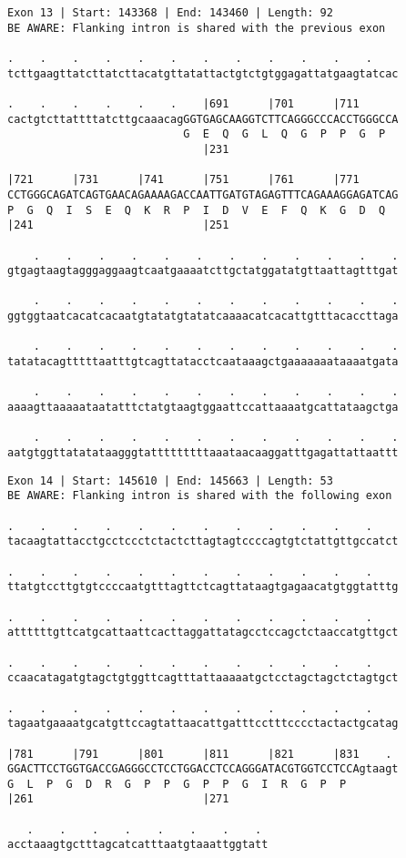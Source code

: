 \documentclass{article}
\begin{document}
\begin{Verbatim}[fontfamily=courier]
Exon 13 | Start: 143368 | End: 143460 | Length: 92
BE AWARE: Flanking intron is shared with the previous exon

.    .    .    .    .    .    .    .    .    .    .    .    
tcttgaagttatcttatcttacatgttatattactgtctgtggagattatgaagtatcac

.    .    .    .    .    .    |691      |701      |711      
cactgtcttattttatcttgcaaacagGGTGAGCAAGGTCTTCAGGGCCCACCTGGGCCA
                           G  E  Q  G  L  Q  G  P  P  G  P  
                              |231                          

|721      |731      |741      |751      |761      |771      
CCTGGGCAGATCAGTGAACAGAAAAGACCAATTGATGTAGAGTTTCAGAAAGGAGATCAG
P  G  Q  I  S  E  Q  K  R  P  I  D  V  E  F  Q  K  G  D  Q  
|241                          |251                          

    .    .    .    .    .    .    .    .    .    .    .    .
gtgagtaagtagggaggaagtcaatgaaaatcttgctatggatatgttaattagtttgat

    .    .    .    .    .    .    .    .    .    .    .    .
ggtggtaatcacatcacaatgtatatgtatatcaaaacatcacattgtttacaccttaga

    .    .    .    .    .    .    .    .    .    .    .    .
tatatacagtttttaatttgtcagttatacctcaataaagctgaaaaaaataaaatgata

    .    .    .    .    .    .    .    .    .    .    .    .
aaaagttaaaaataatatttctatgtaagtggaattccattaaaatgcattataagctga

    .    .    .    .    .    .    .    .    .    .    .    .
aatgtggttatatataagggtatttttttttaaataacaaggatttgagattattaattt
\end{Verbatim}
\newpage
\begin{Verbatim}[fontfamily=courier]
Exon 14 | Start: 145610 | End: 145663 | Length: 53
BE AWARE: Flanking intron is shared with the following exon

.    .    .    .    .    .    .    .    .    .    .    .    
tacaagtattacctgcctccctctactcttagtagtccccagtgtctattgttgccatct

.    .    .    .    .    .    .    .    .    .    .    .    
ttatgtccttgtgtccccaatgtttagttctcagttataagtgagaacatgtggtatttg

.    .    .    .    .    .    .    .    .    .    .    .    
attttttgttcatgcattaattcacttaggattatagcctccagctctaaccatgttgct

.    .    .    .    .    .    .    .    .    .    .    .    
ccaacatagatgtagctgtggttcagtttattaaaaatgctcctagctagctctagtgct

.    .    .    .    .    .    .    .    .    .    .    .    
tagaatgaaaatgcatgttccagtattaacattgatttcctttcccctactactgcatag

|781      |791      |801      |811      |821      |831    . 
GGACTTCCTGGTGACCGAGGGCCTCCTGGACCTCCAGGGATACGTGGTCCTCCAgtaagt
G  L  P  G  D  R  G  P  P  G  P  P  G  I  R  G  P  P        
|261                          |271                          

   .    .    .    .    .    .    .    . 
acctaaagtgctttagcatcatttaatgtaaattggtatt
\end{Verbatim}
\end{document}
